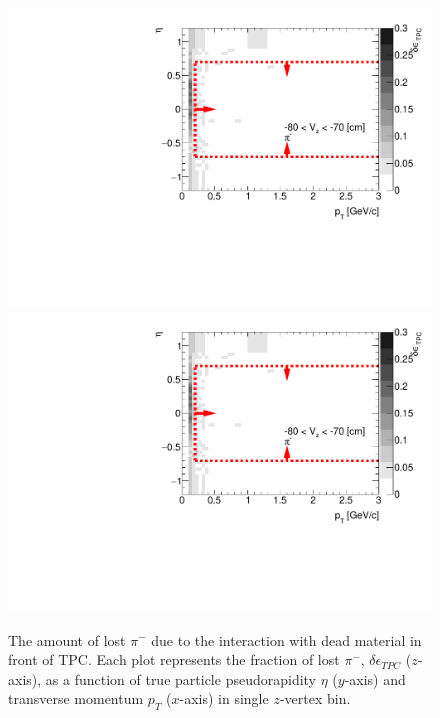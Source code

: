 \begin{figure}[hb]
\caption[The amount of lost $\pi^-$ due to the interaction with dead material in front of TPC as a function of $p_T$, $\eta$ and $z$-vertex in CD]{The amount of lost $\pi^-$ due to the interaction with dead material in front of TPC. Each plot represents the fraction of lost $\pi^-$, $\delta\epsilon_{ TPC}$ ($z$-axis), as a function of true particle pseudorapidity $\eta$ ($y$-axis) and transverse momentum $p_{T}$ ($x$-axis) in single $z$-vertex bin.}\label{fig:dead_materialCD3D}
\centering
\parbox{0.495\textwidth}{
  \centering
  \includegraphics[width=\linewidth,page=1]{graphics/systematicsEfficiency/deadMaterial/secondaries_Unbinned_CD_.pdf}\\
  \includegraphics[width=\linewidth,page=3]{graphics/systematicsEfficiency/deadMaterial/secondaries_Unbinned_CD_.pdf}\\
}
\end{figure}
